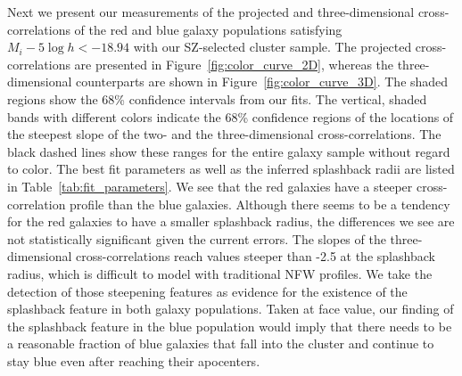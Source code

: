 \documentclass[iop, apjl, twocolappendix, numberedappendix]{emulateapj}
\begin{document}
Next we present our measurements of the projected and
three-dimensional cross-correlations of the red and blue galaxy populations
satisfying $M_{i}-5\log h<-18.94$ with our SZ-selected cluster
sample. The projected cross-correlations are presented in Figure~\ref{fig:color_curve_2D},
whereas the three-dimensional counterparts are shown in 
Figure~\ref{fig:color_curve_3D}. The shaded regions show
the 68\% confidence intervals from our fits. The vertical, shaded
bands with different colors indicate the 68\% confidence regions of
the locations of the steepest slope of the two- and the
three-dimensional cross-correlations. The black dashed lines show
these ranges for the entire galaxy sample without regard to color.
The best fit parameters as well as the inferred splashback radii are
listed in Table~\ref{tab:fit_parameters}. We
see that the red galaxies have a steeper cross-correlation profile
than the blue galaxies. Although there seems to be  a tendency for the red
galaxies to have a smaller splashback radius, the differences we see
are not statistically significant given the current errors. The
slopes of the three-dimensional cross-correlations reach values
steeper than -2.5 at the splashback radius, which is difficult to model with
traditional NFW profiles. We take the detection of those steepening features 
as evidence for the existence of the splashback feature in both galaxy populations.
Taken at face value, our finding of the splashback feature in the blue
population would imply that there needs to be a reasonable fraction of
blue galaxies that fall into the cluster and continue to stay blue
even after reaching their apocenters.


\end{document}

